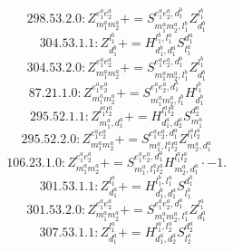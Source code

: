 \documentclass[letterpaper,10pt,fleqn,leqno,onecolumn]{article}
\begin{document}
\begin{equation} \;\;\;\;\;\;  298.53.2.0: Z^{e_{1}^{a}e_{2}^{a}}_{m_{1}^{a}m_{2}^{a}}+=S^{e_{1}^{a}e_{2}^{a},d_{1}^{b}}_{m_{1}^{a}m_{2}^{a},l_{1}^{b}}Z^{l_{1}^{b}}_{d_{1}^{b}} \end{equation}
\begin{equation} \;\;\;\;\;\;  304.53.1.1: Z^{l_{1}^{b}}_{d_{1}^{b}}+=H^{l_{1}^{b},l_{1}^{a}}_{d_{1}^{b},d_{1}^{a}}S^{d_{1}^{a}}_{l_{1}^{a}} \end{equation}
\begin{equation} \;\;\;\;\;\;  304.53.2.0: Z^{e_{1}^{a}e_{2}^{a}}_{m_{1}^{a}m_{2}^{a}}+=S^{e_{1}^{a}e_{2}^{a},d_{1}^{b}}_{m_{1}^{a}m_{2}^{a},l_{1}^{b}}Z^{l_{1}^{b}}_{d_{1}^{b}} \end{equation}
\begin{equation} \;\;\;\;\;\;  87.21.1.0: Z^{e_{1}^{a}e_{2}^{a}}_{m_{1}^{a}m_{2}^{a}}+=S^{e_{1}^{a}e_{2}^{a},d_{1}^{b}}_{m_{1}^{a}m_{2}^{a},l_{1}^{b}}H^{l_{1}^{b}}_{d_{1}^{b}} \end{equation}
\begin{equation} \;\;\;\;\;\;  295.52.1.1: Z^{l_{1}^{a}l_{2}^{a}}_{m_{1}^{a},d_{1}^{a}}+=H^{l_{1}^{a}l_{2}^{a}}_{d_{1}^{a},d_{2}^{a}}S^{d_{2}^{a}}_{m_{1}^{a}} \end{equation}
\begin{equation} \;\;\;\;\;\;  295.52.2.0: Z^{e_{1}^{a}e_{2}^{a}}_{m_{1}^{a}m_{2}^{a}}+=S^{e_{1}^{a}e_{2}^{a},d_{1}^{a}}_{m_{1}^{a},l_{1}^{a}l_{2}^{a}}Z^{l_{1}^{a}l_{2}^{a}}_{m_{2}^{a},d_{1}^{a}} \end{equation}
\begin{equation} \;\;\;\;\;\;  106.23.1.0: Z^{e_{1}^{a}e_{2}^{a}}_{m_{1}^{a}m_{2}^{a}}+=S^{e_{1}^{a}e_{2}^{a},d_{1}^{a}}_{m_{1}^{a},l_{1}^{a}l_{2}^{a}}H^{l_{1}^{a}l_{2}^{a}}_{m_{2}^{a},d_{1}^{a}}\cdot -1. \end{equation}
\begin{equation} \;\;\;\;\;\;  301.53.1.1: Z^{l_{1}^{a}}_{d_{1}^{a}}+=H^{l_{1}^{b},l_{1}^{a}}_{d_{1}^{b},d_{1}^{a}}S^{d_{1}^{b}}_{l_{1}^{b}} \end{equation}
\begin{equation} \;\;\;\;\;\;  301.53.2.0: Z^{e_{1}^{a}e_{2}^{a}}_{m_{1}^{a}m_{2}^{a}}+=S^{e_{1}^{a}e_{2}^{a},d_{1}^{a}}_{m_{1}^{a}m_{2}^{a},l_{1}^{a}}Z^{l_{1}^{a}}_{d_{1}^{a}} \end{equation}
\begin{equation} \;\;\;\;\;\;  307.53.1.1: Z^{l_{1}^{a}}_{d_{1}^{a}}+=H^{l_{1}^{a},l_{2}^{a}}_{d_{1}^{a},d_{2}^{a}}S^{d_{2}^{a}}_{l_{2}^{a}} \end{equation}
\end{document}
